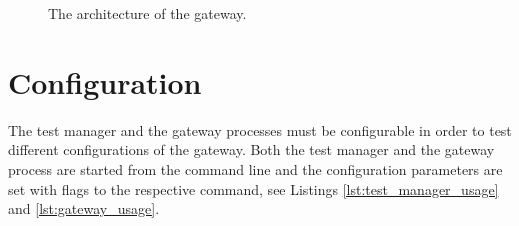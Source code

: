 \begin{figure}[h!]
    \centering
    \caption{The architecture of the gateway.}
    \label{fig:gateway_impl_architecture}
\end{figure}

\section{Configuration}

The test manager and the gateway processes must be configurable in order to
test different configurations of the gateway. Both the test manager and the
gateway process are started from the command line and the configuration
parameters are set with flags to the respective command, see Listings
\ref{lst:test_manager_usage} and \ref{lst:gateway_usage}.

